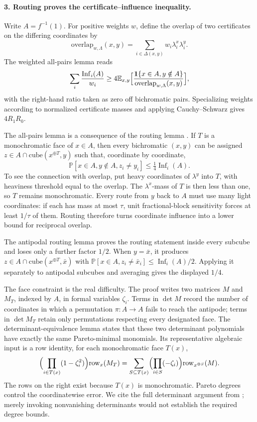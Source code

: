 \documentclass[11pt]{article}
\theoremstyle{definition}\newtheorem{definition}[theorem]{Definition}
\theoremstyle{remark}\newtheorem{remark}[theorem]{Remark}
\newcommand{\E}{\mathbb E}\newcommand{\Prb}{\mathbb P}
\DeclareMathOperator{\Inf}{Inf}\DeclareMathOperator{\Var}{Var}
\begin{document}
\paragraph{3. Routing proves the certificate--influence inequality.}
Write \(A=f^{-1}(1)\). For positive weights \(w\), define the overlap of two certificates on the differing coordinates by
\[
 \mathrm{overlap}_{w,\Lambda}(x,y)=\sum_{i\in\Delta(x,y)}w_i\lambda^x_i\lambda^y_i.
\]
The weighted all-pairs lemma \cite[Lemma~2.8]{BDST26} reads
\[
 \sum_i\frac{\Inf_i(A)}{w_i}\ge4\E_{x,y}\Bigl[\frac{\mathbf 1\{x\in A,y\notin A\}}{\mathrm{overlap}_{w,\Lambda}(x,y)}\Bigr],
\]
with the right-hand ratio taken as zero off bichromatic pairs. Specializing weights according to normalized certificate masses and applying Cauchy--Schwarz gives \(4R_1R_0\).

The all-pairs lemma is a consequence of the routing lemma \cite[Lemma~2.10]{BDST26}. If \(T\) is a monochromatic face of \(x\in A\), then every bichromatic \((x,y)\) can be assigned \(z\in A\cap\mathrm{cube}(x^{\oplus T},y)\) such that, coordinate by coordinate,
\[
 \Prb[x\in A,y\notin A,z_i\ne y_i]\le\tfrac14\Inf_i(A).
\]
To see the connection with overlap, put heavy coordinates of \(\lambda^y\) into \(T\), with heaviness threshold equal to the overlap. The \(\lambda^x\)-mass of \(T\) is then less than one, so \(T\) remains monochromatic. Every route from \(y\) back to \(A\) must use many light coordinates: if each has mass at most \(\tau\), unit fractional-block sensitivity forces at least \(1/\tau\) of them. Routing therefore turns coordinate influence into a lower bound for reciprocal overlap.

The antipodal routing lemma \cite[Lemma~2.11]{BDST26} proves the routing statement inside every subcube and loses only a further factor \(1/2\). When \(y=\bar x\), it produces \(z\in A\cap\mathrm{cube}(x^{\oplus T},\bar x)\) with \(\Prb[x\in A,z_i\ne\bar x_i]\le\Inf_i(A)/2\). Applying it separately to antipodal subcubes and averaging gives the displayed \(1/4\).

The face constraint is the real difficulty. The proof writes two matrices \(M\) and \(M_T\), indexed by \(A\), in formal variables \(\zeta_i\). Terms in \(\det M\) record the number of coordinates in which a permutation \(\pi:A\to A\) fails to reach the antipode; terms in \(\det M_T\) retain only permutations respecting every designated face. The determinant-equivalence lemma \cite[Lemma~2.16]{BDST26} states that these two determinant polynomials have exactly the same Pareto-minimal monomials. Its representative algebraic input is a row identity, for each monochromatic face \(T(x)\),
\[
 \Bigl(\prod_{i\in T(x)}(1-\zeta_i^2)\Bigr)\mathrm{row}_x(M_T)=\sum_{S\subseteq T(x)}\Bigl(\prod_{i\in S}(-\zeta_i)\Bigr)\mathrm{row}_{x^{\oplus S}}(M).
\]
The rows on the right exist because \(T(x)\) is monochromatic. Pareto degrees control the coordinatewise error. We cite the full determinant argument from \cite[Sections~2.5 and~3]{BDST26}; merely invoking nonvanishing determinants would not establish the required degree bounds.
\end{document}
